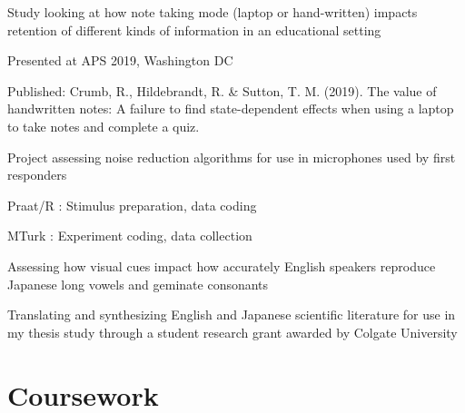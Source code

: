 \documentclass[letterpaper]{deedy-resume_sm}
\begin{document}
\begin{tightitemize}
\item Study looking at how note taking mode (laptop or hand-written) impacts retention of different kinds of information in an educational setting
\item Presented at APS 2019, Washington DC
\item Published: Crumb, R., Hildebrandt, R. \& Sutton, T. M. (2019). The value of handwritten notes: A failure to find state-dependent effects when using a laptop to take notes and complete a quiz.
\end{tightitemize}
\sectionspace

\begin{tightitemize}
\item Project assessing noise reduction algorithms for use in microphones used by first responders
\item Praat/R : Stimulus preparation, data coding
\item MTurk : Experiment coding, data collection
\end{tightitemize}
\sectionspace

\begin{tightitemize}
\item Assessing how visual cues impact how accurately English speakers reproduce Japanese long vowels and geminate consonants
\end{tightitemize}
\sectionspace

\begin{tightitemize}
\item Translating and synthesizing English and Japanese scientific literature for use in my thesis study through a student research grant awarded by Colgate University
\end{tightitemize}
\sectionspace

\section{Coursework}
\end{document}
